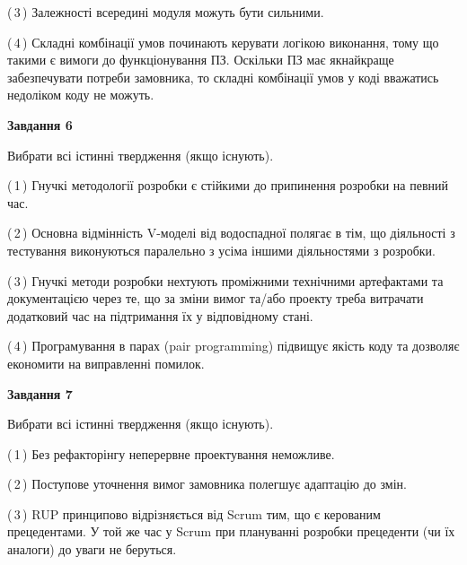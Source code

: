 \documentclass[10pt, ukrainian]{article}
\begin{document}
{\begin {large}
(\,3\,) Залежності всередині модуля можуть бути сильними. %



(\,4\,) Складні комбінації умов починають керувати логікою виконання, тому що такими є вимоги до функціонування ПЗ. Оскільки ПЗ має якнайкраще забезпечувати потреби замовника, то складні комбінації умов у коді вважатись недоліком коду не можуть. %

\newpage

{\begin {center}\textbf{Завдання 6}\end {center}}\par
Вибрати всі істинні твердження (якщо існують).\par
\vspace{2mm}



(\,1\,) Гнучкі методології розробки є стійкими до припинення розробки на певний час. %



(\,2\,) Основна відмінність V-моделі від водоспадної полягає в тім, що діяльності з тестування виконуються паралельно з усіма іншими діяльностями з розробки. %



(\,3\,) Гнучкі методи розробки нехтують проміжними технічними артефактами та документацією через те, що за зміни вимог та/або проекту треба витрачати додатковий час на підтримання їх у відповідному стані. %



(\,4\,) Програмування в парах (pair programming) підвищує якість коду та дозволяє економити на виправленні помилок. %


{\begin {center}\textbf{Завдання 7}\end {center}}\par
Вибрати всі істинні твердження (якщо існують).\par
\vspace{2mm}



(\,1\,) Без рефакторінгу неперервне проектування неможливе. %



(\,2\,) Поступове уточнення вимог замовника полегшує адаптацію до змін. %



(\,3\,) RUP принципово відрізняється від Scrum тим, що є керованим прецедентами. У той же час у Scrum при плануванні розробки прецеденти (чи їх аналоги) до уваги не беруться. %




\end{large}}
\end{document}
